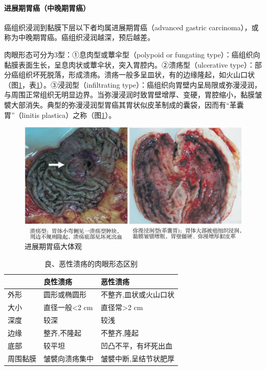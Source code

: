 \paragraph{进展期胃癌（中晚期胃癌）}
癌组织浸润到黏膜下层以下者均属进展期胃癌（advanced gastric
carcinoma），或称为中晚期胃癌。癌组织浸润越深，预后越差。

肉眼形态可分为3型：①息肉型或蕈伞型（polypoid or fungating
type）：癌组织向黏膜表面生长，呈息肉状或蕈伞状，突入胃腔内。②溃疡型（ulcerative
type）：部分癌组织坏死脱落，形成溃疡。溃疡一般多呈皿状，有的边缘隆起，如火山口状（图\ref{fig8-4}，表\ref{tab8-1}）。③浸润型（infiltrating
type）：癌组织向胃壁内呈局限或弥漫浸润，与周围正常组织无明显边界。当弥漫浸润时致胃壁增厚、变硬，胃腔缩小，黏膜皱襞大部消失。典型的弥漫浸润型胃癌其胃状似皮革制成的囊袋，因而有“革囊胃”（linitis
plastica）之称（图\ref{fig8-4}）。

\begin{figure}[!htbp]
 \centering
 \includegraphics{./images/Image00129.jpg}
 \captionsetup{justification=centering}
 \caption{进展期胃癌大体观}
 \label{fig8-4}
  \end{figure} 

\begin{table}[ht]
    \caption{良、恶性溃疡的肉眼形态区别}
    \label{tab8-1}
    \centering
    \begin{tabular}{lll}
    \toprule
    &良性溃疡&恶性溃疡\\
    \midrule
    外形&圆形或椭圆形&不整齐,皿状或火山口状\\
大小&直径一般<2 cm&直径常>2 cm\\
深度&较深&较浅\\
边缘&整齐,不隆起&不整齐,隆起\\
底部&较平坦&凹凸不平，有坏死出血\\
周围黏膜&皱襞向溃疡集中&皱襞中断,呈结节状肥厚\\
    \bottomrule
    \end{tabular}
\end{table}

